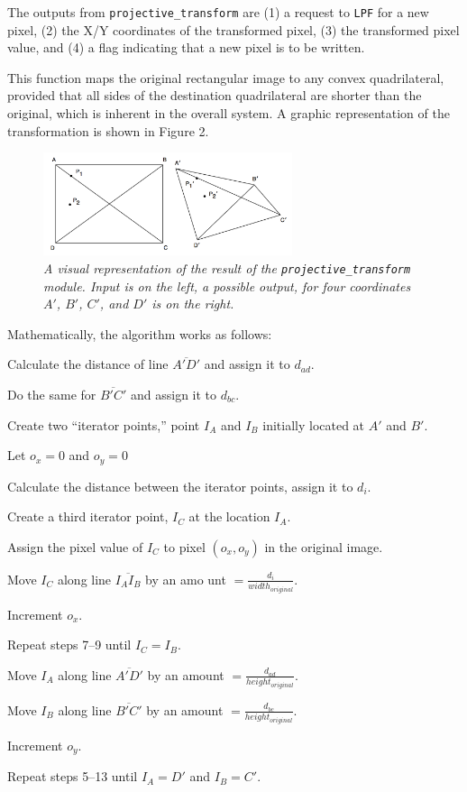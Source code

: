 \documentclass[10pt]{article}
\begin{document}
The outputs from {\tt projective\_transform} are (1) a request to {\tt LPF} for a new pixel, (2) the X/Y coordinates of the transformed pixel, (3) the transformed pixel value, and (4) a flag indicating that a new pixel is to be written.

This function maps the original rectangular image to any convex quadrilateral, provided that all sides of the destination quadrilateral are shorter than the original, which is inherent in the overall system. A graphic representation of the transformation is shown in Figure 2.

\begin{figure}[h!]
\centering
\includegraphics[width=0.65\textwidth]{images/arbiskew_graphic.png}
\caption{\emph{A visual representation of the result of the {\tt projective\_transform} module. Input is on the left, a possible output, for four coordinates $A\prime$, $B\prime$, $C\prime$, and $D\prime$ is on the right.}}
\end{figure}

Mathematically, the algorithm works as follows:
\begin{enumerate*}
\item Calculate the distance of line $\overline{A\prime D\prime}$ and assign it to $d_{ad}$.
\item Do the same for $\overline{B\prime C\prime}$ and assign it to $d_{bc}$.
\item Create two ``iterator points,'' point $I_A$ and $I_B$ initially located at $A\prime$ and $B\prime$.
\item Let $o_x = 0$ and $o_y = 0$
\item Calculate the distance between the iterator points, assign it to $d_i$.
\item Create a third iterator point, $I_C$ at the location $I_A$.
\item Assign the pixel value of $I_C$ to pixel $(o_x, o_y)$ in the original image.
\item Move $I_C$ along line $\overline{I_A I_B}$ by an amo
unt $= \frac{d_i}{width_{original}}$.
\item Increment $o_x$.
\item Repeat steps 7--9 until $I_C = I_B$.
\item Move $I_A$ along line $\overline{A\prime D\prime}$ by an amount $= \frac{d_{ad}}{height_{original}}$.
\item Move $I_B$ along line $\overline{B\prime C\prime}$ by an amount $= \frac{d_{bc}}{height_{original}}$.
\item Increment $o_y$.
\item Repeat steps 5--13 until $I_A = D\prime$ and $I_B = C\prime$.
\end{enumerate*}
\end{document}
